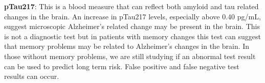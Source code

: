 \textbf{pTau217}: This is a blood measure that can reflect both amyloid and tau related changes in the brain. An increase in pTau217 levels, especially above 0.40 pg/mL, suggest microscopic Alzheimer’s related change may be present in the brain. This is not a diagnostic test but in patients with memory changes this test can suggest that memory problems may be related to Alzheimer’s changes in the brain. In those without memory problems, we are still studying if an abnormal test result can be used to predict long term risk. False positive and false negative test results can occur.
